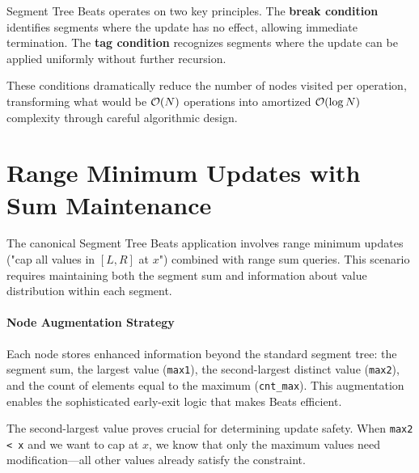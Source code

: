 Segment Tree Beats operates on two key principles. The \textbf{break condition} identifies segments where the update has no effect, allowing immediate termination. The \textbf{tag condition} recognizes segments where the update can be applied uniformly without further recursion.

These conditions dramatically reduce the number of nodes visited per operation, transforming what would be $\mathcal{O}(N)$ operations into amortized $\mathcal{O}(\log N)$ complexity through careful algorithmic design.

\section{Range Minimum Updates with Sum Maintenance}
\label{sec:range_chmin_sum}

The canonical Segment Tree Beats application involves range minimum updates ("cap all values in $[L,R]$ at $x$") combined with range sum queries. This scenario requires maintaining both the segment sum and information about value distribution within each segment.

\paragraph{Node Augmentation Strategy}

Each node stores enhanced information beyond the standard segment tree: the segment sum, the largest value (\texttt{max1}), the second-largest distinct value (\texttt{max2}), and the count of elements equal to the maximum (\texttt{cnt\_max}). This augmentation enables the sophisticated early-exit logic that makes Beats efficient.

The second-largest value proves crucial for determining update safety. When \texttt{max2 < x} and we want to cap at $x$, we know that only the maximum values need modification—all other values already satisfy the constraint.


